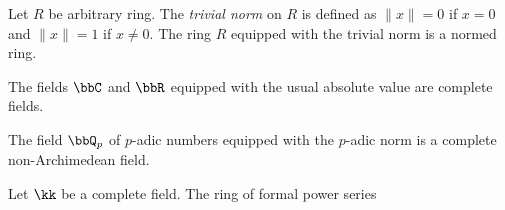     \begin{example}\label{eg:trivial_normed_rings}
        Let \(R\) be arbitrary ring.
        The \emph{trivial norm} on \(R\) is defined as \(\|x\| = 0\) if \(x = 0\) and \(\|x\| = 1\) if \(x \neq 0\).
        The ring \(R\) equipped with the trivial norm is a normed ring.
    \end{example}

    \begin{example}\label{eg:C_and_R_as_complete_fields}
        The fields \(\bbC\) and \(\bbR\) equipped with the usual absolute value are complete fields.
    \end{example}

    \begin{example}\label{eg:p-adic_fields_as_complete_fields}
        The field \(\bbQ_p\) of \(p\)-adic numbers equipped with the \(p\)-adic norm is a complete non-Archimedean field.
    \end{example}

    \begin{example}\label{eg:k_t_as_banach_rings}
        Let \(\kk\) be a complete field.
        The ring of formal power series 

    \end{example}

